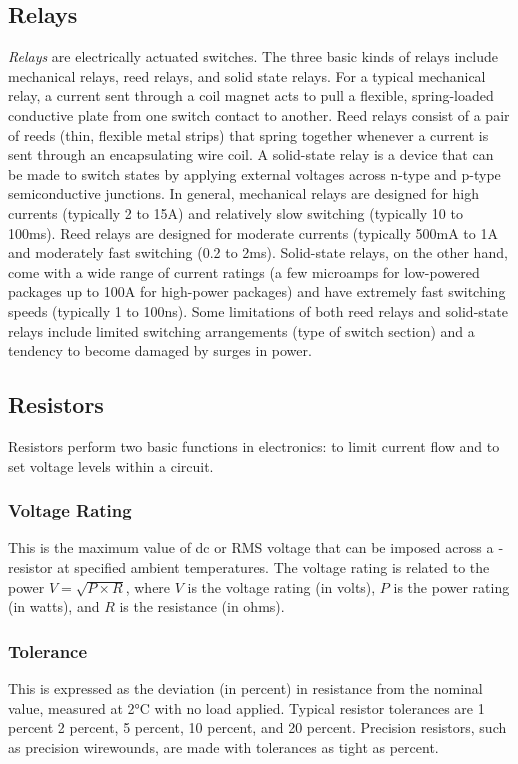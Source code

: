 \documentclass[../../document]{subfiles}
\begin{document}
\subsection{Relays}
\emph{Relays} are electrically actuated switches. The three basic kinds of
relays include mechanical relays, reed relays, and solid state relays. For a
typical mechanical relay, a current sent through a coil magnet acts to pull a
flexible, spring-loaded conductive plate from one switch contact to another.
Reed relays consist of a pair of reeds (thin, flexible metal strips) that
spring together whenever a current is sent through an encapsulating wire coil.
A solid-state relay is a device that can be made to switch states by applying
external voltages across n-type and p-type semiconductive junctions. In
general, mechanical relays are designed for high currents (typically 2 to
15\unit{\ampere}) and relatively slow switching (typically 10 to
100\unit{\milli\second}). Reed relays are designed for moderate currents
(typically 500\unit{\milli\ampere} to 1\unit{\ampere} and moderately fast
switching (0.2 to 2\unit{\milli\second}). Solid-state relays, on the other
hand, come with a wide range of current ratings (a few microamps for
low-powered packages up to 100\unit{\ampere} for high-power packages) and have
extremely fast switching speeds (typically 1 to 100\unit{\nano\second}). Some
limitations of both reed relays and solid-state relays include limited
switching arrangements (type of switch section) and a tendency to become
damaged by surges in power. \cite{practical_electronics}

\subsection{Resistors}
Resistors perform two basic functions in electronics: to limit current flow and
to set voltage levels within a circuit.

\subsubsection{Voltage Rating}
This is the maximum value of dc or RMS voltage that can be imposed across a ­
resistor at specified ambient temperatures. The voltage rating is related to
the power \(V=\sqrt{P\times R}\), where \(V\) is the voltage rating (in volts),
\(P\) is the power rating (in watts), and \(R\)  is the resistance (in ohms).
\cite{practical_electronics}

\subsubsection{Tolerance}
This is expressed as the deviation (in percent) in resistance from the nominal
value, measured at 2\unit{\celsius} with no load applied. Typical resistor
tolerances are 1 percent 2 percent, 5 percent, 10 percent, and 20 percent.
Precision resistors, such as precision wirewounds, are made with tolerances as
tight as  percent. \cite{practical_electronics}
\end{document}
